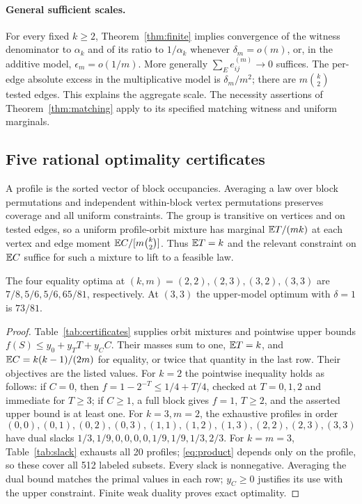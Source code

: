 \paragraph{General sufficient scales.}
For every fixed \(k\geq2\), Theorem~\ref{thm:finite} implies convergence
of the witness denominator to \(\alpha_k\) and of its ratio to
\(1/\alpha_k\) whenever \(\delta_m=o(m)\), or, in the additive model,
\(\epsilon_m=o(1/m)\). More generally \(\sum_E e_{ij}^{(m)}\to0\)
suffices. The per-edge absolute excess in the multiplicative model is
\(\delta_m/m^2\); there are \(m\binom k2\) tested edges. This explains
the aggregate scale. The necessity assertions of Theorem~\ref{thm:matching}
apply to its specified matching witness and uniform marginals.

\subsection{Five rational optimality certificates}\label{sec:certificates}
A profile is the sorted vector of block occupancies. Averaging a law over
block permutations and independent within-block vertex permutations preserves
coverage and all uniform constraints. The group is transitive on vertices
and on tested edges, so a uniform profile-orbit mixture has marginal
\(\mathbb E T/(mk)\) at each vertex and edge moment
\(\mathbb E C/[m\binom k2]\). Thus \(\mathbb E T=k\) and the relevant constraint on
\(\mathbb E C\) suffice for such a mixture to lift to a feasible law.

\begin{proposition}\label{prop:finite}
The four equality optima at \((k,m)=(2,2),(2,3),(3,2),(3,3)\) are
\(7/8,5/6,5/6,65/81\), respectively. At \((3,3)\) the upper-model
optimum with \(\delta=1\) is \(73/81\).
\end{proposition}
\begin{proof}
Table~\ref{tab:certificates} supplies orbit mixtures and pointwise upper
bounds \(f(S)\leq y_0+y_TT+y_CC\). Their masses sum to one,
\(\mathbb E T=k\), and \(\mathbb E C=k(k-1)/(2m)\) for equality, or twice that
quantity in the last row. Their objectives are the listed values.
For \(k=2\) the pointwise inequality holds as follows: if \(C=0\),
then \(f=1-2^{-T}\leq1/4+T/4\), checked at \(T=0,1,2\) and immediate
for \(T\geq3\); if \(C\geq1\), a full block gives \(f=1\),
\(T\geq2\), and the asserted upper bound is at least one.
For \(k=3,m=2\), the exhaustive profiles in order
\[
 (0,0),(0,1),(0,2),(0,3),(1,1),(1,2),(1,3),(2,2),(2,3),(3,3)
\]
have dual slacks
\(1/3,1/9,0,0,0,0,1/9,1/9,1/3,2/3\).
For \(k=m=3\), Table~\ref{tab:slack} exhausts all 20 profiles;
\eqref{eq:product} depends only on the profile, so these cover all 512
labeled subsets. Every slack is nonnegative. Averaging the dual bound
matches the primal values in each row; \(y_C\geq0\) justifies its use
with the upper constraint. Finite weak duality proves exact optimality.
\end{proof}

